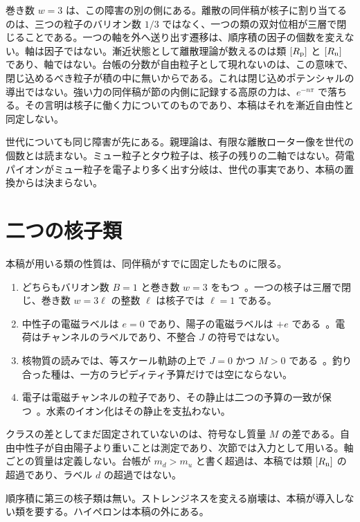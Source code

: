 \documentclass[a4paper]{article}
\begin{document}
巻き数 \(w=3\) は、この障害の別の側にある。離散の同伴稿が核子に割り当てるのは、三つの粒子のバリオン数 \(1/3\) ではなく、一つの類の双対位相が三層で閉じることである。一つの軸を外へ送り出す遷移は、順序積の因子の個数を変えない。軸は因子ではない。漸近状態として離散理論が数えるのは類 \([R_{\rm p}]\) と \([R_{\rm n}]\) であり、軸ではない。台帳の分数が自由粒子として現れないのは、この意味で、閉じ込めるべき粒子が積の中に無いからである。これは閉じ込めポテンシャルの導出ではない。強い力の同伴稿が節の内側に記録する高原の力は、\(e^{-n\pi}\) で落ちる。その言明は核子に働く力についてのものであり、本稿はそれを漸近自由性と同定しない。

世代についても同じ障害が先にある。親理論は、有限な離散ローター像を世代の個数とは読まない。ミュー粒子とタウ粒子は、核子の残りの二軸ではない。荷電パイオンがミュー粒子を電子より多く出す分岐は、世代の事実であり、本稿の置換からは決まらない。

\section{二つの核子類}
\label{sec:classes}

本稿が用いる類の性質は、同伴稿がすでに固定したものに限る。

\begin{enumerate}
\item どちらもバリオン数 \(B=1\) と巻き数 \(w=3\) をもつ~\cite{dst-dio}。一つの核子は三層で閉じ、巻き数 \(w=3\ell\) の整数 \(\ell\) は核子では \(\ell=1\) である。
\item 中性子の電磁ラベルは \(e=0\) であり、陽子の電磁ラベルは \(+e\) である~\cite{dst-strong}。電荷はチャンネルのラベルであり、不整合 \(J\) の符号ではない。
\item 核物質の読みでは、等スケール軌跡の上で \(J=0\) かつ \(M>0\) である~\cite{dst-main}。釣り合った種は、一方のラピディティ予算だけでは空にならない。
\item 電子は電磁チャンネルの粒子であり、その静止は二つの予算の一致が保つ~\cite{dst-main}。水素のイオン化はその静止を支払わない。
\end{enumerate}

クラスの差としてまだ固定されていないのは、符号なし質量 \(M\) の差である。自由中性子が自由陽子より重いことは測定であり、次節では入力として用いる。軸ごとの質量は定義しない。台帳が \(m_d>m_u\) と書く超過は、本稿では類 \([R_{\rm n}]\) の超過であり、ラベル \(d\) の超過ではない。

順序積に第三の核子類は無い。ストレンジネスを変える崩壊は、本稿が導入しない類を要する。ハイペロンは本稿の外にある。
\end{document}

